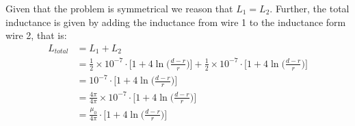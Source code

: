 \documentclass{article}
\begin{document}
Given that the problem is symmetrical we reason that $L_1 = L_2$. Further, the total inductance is given by adding the inductance from wire 1 to the inductance form wire 2, that is:
\begin{align*}
	L_{total} 	&= L_1 + L_2\\
				&= \frac{1}{2} \times 10^{-7} \cdot \big[ 1 + 4 \ln \big(\frac{d-r}{r} \big) \big] + \frac{1}{2} \times 10^{-7} \cdot \big[ 1 + 4 \ln \big(\frac{d-r}{r} \big) \big]\\
				&= 10^{-7} \cdot \big[ 1 + 4 \ln \big(\frac{d-r}{r} \big) \big]\\
				&= \frac{4 \pi}{4 \pi} \times 10^{-7} \cdot \big[ 1 + 4 \ln \big(\frac{d-r}{r} \big) \big]\\
				&= \frac{\mu_0}{4 \pi} \cdot \big[ 1 + 4 \ln \big(\frac{d-r}{r} \big) \big]
\end{align*}
\end{document}
